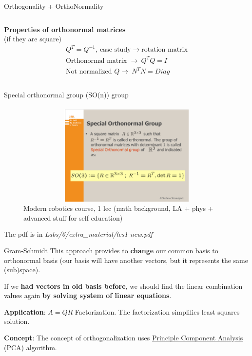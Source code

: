 \documentclass[aspectratio=169]{beamer}
\begin{document}
\begin{frame}[t]{Orthogonality + OrthoNormality}
\begin{columns}[T,onlytextwidth]
\begin{column}{0.49\textwidth}
            \centering \textbf{Properties of orthonormal matrices} \\ {\centering (if they are square)}
            \begin{align*}
                Q^T=Q^{-1},\ \text{case study} \rightarrow \text{rotation matrix} \\
                \text{Orthonormal matrix }\rightarrow \ Q^TQ = I \\
                \text{Not normalized } Q \rightarrow \ N^TN = Diag
            \end{align*}
        \end{column}
    \end{columns}
\end{frame}

\begin{frame}[t]{Special orthonormal group (SO(n)) group}
    \framesubtitle{}
    \vspace{-0.5cm}
    \begin{figure}[H]
        \centering\includegraphics[height=5cm,width=1\textwidth,keepaspectratio]{course_modern.png}
        \caption*{Modern robotics course, 1 lec (math background, LA + phys + advanced stuff for self education)}
        \label{fig:course_modern.png}
    \end{figure}
    \centering \vspace{-0.5cm}
    The pdf is in \textit{Labs/6/extra\_material/les1-new.pdf}
\end{frame}

\begin{frame}[t]{Gram-Schmidt}
    \vspace{-0.5cm}
    \Large
    This approach provides to \textbf{change} our \alert{common basis} to \alert{orthonormal basis} (our basis will have another vectors, but it represents the same (sub)space).

    If we \textbf{had vectors in old basis before}, we should find the linear combination values again \textbf{by solving system of linear equations}.

    \textbf{Application}: $A=QR$ Factorization. The factorization simplifies least squares solution.

    \textbf{Concept}: The concept of orthogonalization uses \href{https://en.wikipedia.org/wiki/Principal_component_analysis}{Principle Component Analysis} (PCA) algorithm. 

\end{frame}
\end{document}
